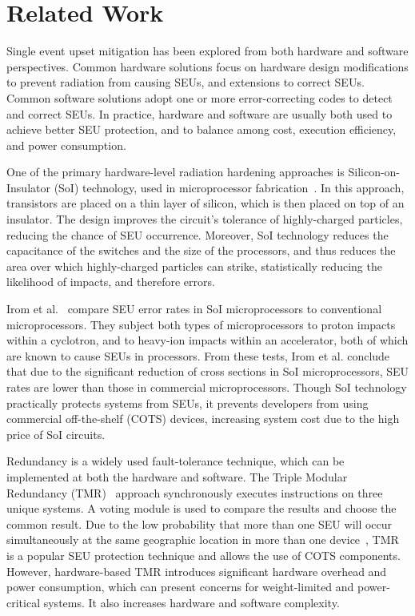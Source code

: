 \vspace{-15pt}
\section{Related Work}\label{sec:related_work}
\vspace{-10pt}
Single event upset mitigation has been explored from both hardware and software perspectives. Common hardware solutions focus on hardware design modifications to prevent radiation from causing SEUs, and extensions to correct SEUs. Common software solutions adopt one or more error-correcting codes to detect and correct SEUs. In practice, hardware and software are usually both used to achieve better SEU protection, and to balance among cost, execution efficiency, and power consumption.

One of the primary hardware-level radiation hardening approaches is Silicon-on-Insulator (SoI) technology, used in microprocessor fabrication~\cite{Celler2003SOI}. In this approach, transistors are placed on a thin layer of silicon, which is then placed on top of an insulator. The design improves the circuit's tolerance of highly-charged particles, reducing the chance of SEU occurrence. Moreover, SoI technology reduces the capacitance of the switches and the size of the processors, and thus reduces the area over which highly-charged particles can strike, statistically reducing the likelihood of impacts, and therefore errors.

Irom et al.~\cite{Irom2002SOI} compare SEU error rates in  SoI microprocessors to conventional microprocessors. They subject both types of microprocessors to proton impacts within a cyclotron, and to heavy-ion impacts within an accelerator, both of which are known to cause SEUs in processors. From these tests, Irom et al. conclude that due to the significant reduction of cross sections in SoI microprocessors, SEU rates are lower than those in commercial microprocessors. Though SoI technology practically protects systems from SEUs, it prevents developers from using commercial off-the-shelf (COTS) devices, increasing system cost due to the high price of SoI circuits.

Redundancy is a widely used fault-tolerance technique, which can be implemented at both the hardware and software. The Triple Modular Redundancy (TMR)~\cite{TMR} approach synchronously executes instructions on three unique systems. A voting module is used to compare the results and choose the common result. Due to the low probability that more than one SEU will occur simultaneously at the same geographic location in more than one device~\cite{underwood1992observations}, TMR is a popular SEU protection technique and allows the use of COTS components. However, hardware-based TMR introduces significant hardware overhead and power consumption, which can present concerns for weight-limited and power-critical systems. It also increases hardware and software complexity. 

